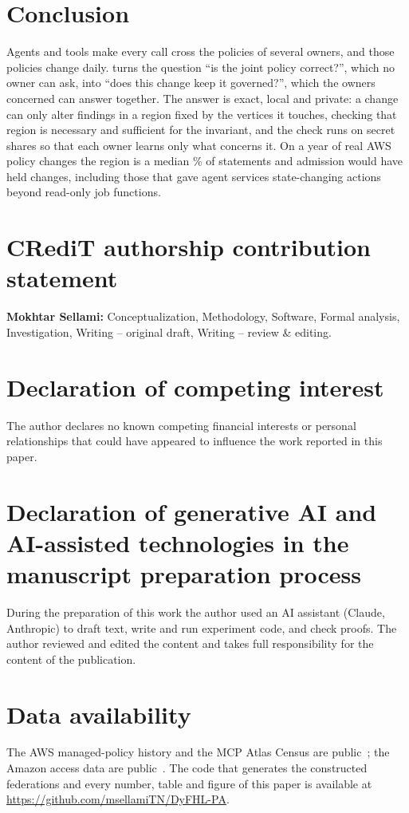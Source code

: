 \section{Conclusion}\label{sec:conclusion}
Agents and tools make every call cross the policies of several owners, and those policies change daily. \name{} turns the question ``is the joint policy correct?'', which no owner can ask, into ``does this change keep it governed?'', which the owners concerned can answer together. The answer is exact, local and private: a change can only alter findings in a region fixed by the vertices it touches, checking that region is necessary and sufficient for the invariant, and the check runs on secret shares so that each owner learns only what concerns it. On a year of real AWS policy changes the region is a median \awsRegMed\% of statements and admission would have held \awsHeld{} changes, including those that gave agent services state-changing actions beyond read-only job functions.

\section*{CRediT authorship contribution statement}
\textbf{Mokhtar Sellami:} Conceptualization, Methodology, Software, Formal analysis, Investigation, Writing -- original draft, Writing -- review \& editing.

\section*{Declaration of competing interest}
The author declares no known competing financial interests or personal relationships that could have appeared to influence the work reported in this paper.

\section*{Declaration of generative AI and AI-assisted technologies in the manuscript preparation process}
During the preparation of this work the author used an AI assistant (Claude, Anthropic) to draft text, write and run experiment code, and check proofs. The author reviewed and edited the content and takes full responsibility for the content of the publication.

\section*{Data availability}
The AWS managed-policy history and the MCP Atlas Census are public~\cite{mamip,mcpatlas2026}; the Amazon access data are public~\cite{kaggle2013amazon}. The code that generates the constructed federations and every number, table and figure of this paper is available at \url{https://github.com/msellamiTN/DyFHL-PA}.
